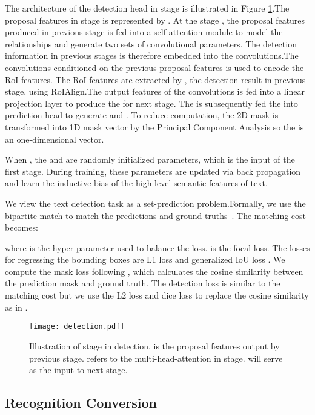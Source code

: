 \documentclass[10pt,twocolumn,letterpaper]{article}
\begin{document}
The architecture of the detection head in  stage is illustrated in Figure \ref{fig:detector}.The proposal features in  stage is represented by .
At the stage , 
the proposal features  produced in previous stage is fed into a self-attention module\cite{vaswani2017attention}  to model the relationships and generate two sets of convolutional parameters.
The detection information in previous stages is therefore embedded into the convolutions.The convolutions conditioned on the previous proposal features is used to encode the RoI features.
The RoI features are extracted by , the detection result in previous stage, using RoIAlign\cite{he2017mask}.The output features of the convolutions is fed into a linear projection layer to produce the  for next stage. 
The  is subsequently fed the into prediction head to generate  and .
To reduce computation, the 2D mask is transformed into 1D mask vector by the Principal Component Analysis\cite{wold1987principal} so the  is an one-dimensional vector.


When , the  and  are randomly initialized parameters, which is the input of the first stage. 
During training, these parameters are updated via back propagation and learn the inductive bias of the high-level semantic features of text.

We view the text detection task as a set-prediction problem.Formally, we use the bipartite match to match the predictions and ground truths~\cite{carion2020end,stewart2016end,sun2021sparse,hu2021istr}. The matching cost becomes:

where  is the hyper-parameter used to balance the loss.  is the focal loss\cite{lin2017focal}. 
The losses for regressing the bounding boxes are L1 loss  and generalized IoU loss  \cite{rezatofighi2019generalized}. 
We compute the mask loss  following \cite{hu2021istr}, which calculates the cosine similarity between the prediction mask and ground truth. The detection loss is similar to the matching cost but we use the L2 loss and dice loss \cite{milletari2016v} to replace the cosine similarity as in \cite{hu2021istr}.


\begin{figure}[t!]
    \centering
    \texttt{[image: detection.pdf]}
    \caption{Illustration of  stage in detection.  is the proposal features output by previous stage. 
     refers to the multi-head-attention in  stage.  will serve as the input to next stage.
    }
    \label{fig:detector}
\end{figure}

\subsection{Recognition Conversion}
\label{sec:Recognition Conversion}
\end{document}
